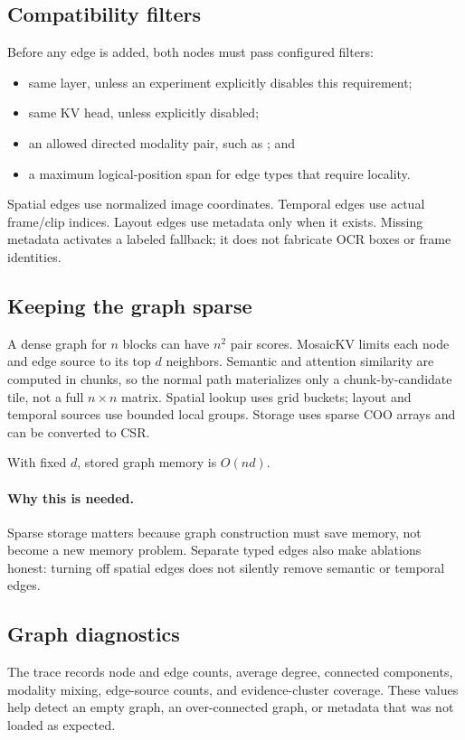 \documentclass[11pt]{article}
\newcommand{\code}[1]{\texttt{\detokenize{#1}}}
\newcommand{\why}{\paragraph{Why this is needed.}}
\begin{document}
\subsection{Compatibility filters}

Before any edge is added, both nodes must pass configured filters:

\begin{itemize}
  \item same layer, unless an experiment explicitly disables this requirement;
  \item same KV head, unless explicitly disabled;
  \item an allowed directed modality pair, such as \code{text:image}; and
  \item a maximum logical-position span for edge types that require locality.
\end{itemize}

Spatial edges use normalized image coordinates. Temporal edges use actual frame/clip indices.
Layout edges use metadata only when it exists. Missing metadata activates a labeled fallback; it
does not fabricate OCR boxes or frame identities.

\subsection{Keeping the graph sparse}

A dense graph for $n$ blocks can have $n^2$ pair scores. MosaicKV limits each node and edge source
to its top $d$ neighbors. Semantic and attention similarity are computed in chunks, so the normal
path materializes only a chunk-by-candidate tile, not a full $n\times n$ matrix. Spatial lookup
uses grid buckets; layout and temporal sources use bounded local groups. Storage uses sparse COO
arrays and can be converted to CSR.

With fixed $d$, stored graph memory is $O(nd)$.

\why Sparse storage matters because graph construction must save memory, not become a new memory
problem. Separate typed edges also make ablations honest: turning off spatial edges does not
silently remove semantic or temporal edges.

\subsection{Graph diagnostics}

The trace records node and edge counts, average degree, connected components, modality mixing,
edge-source counts, and evidence-cluster coverage. These values help detect an empty graph, an
over-connected graph, or metadata that was not loaded as expected.
\end{document}
